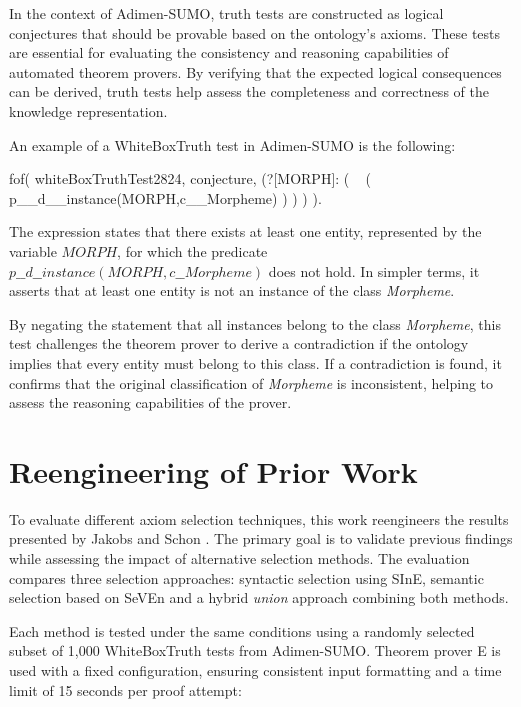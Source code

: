 \documentclass[english,version-2020-11]{uzl-thesis}
\begin{document}
In the context of Adimen-SUMO, truth tests are constructed as logical conjectures that should be provable based on the ontology's axioms. These tests are essential for evaluating the consistency and reasoning capabilities of automated theorem provers. By verifying that the expected logical consequences can be derived, truth tests help assess the completeness and correctness of the knowledge representation. 

An example of a WhiteBoxTruth test in Adimen-SUMO is the following:

\begin{Pseudocode}[morekeywords = {add, create}, deletekeywords={to}, numbers=left,
    caption = {WhiteboxTruth test example}]
    fof( whiteBoxTruthTest2824, conjecture,
        (?[MORPH]: 
            (
                ~ (
                    p__d__instance(MORPH,c__Morpheme)
                )
            )
        )
    ).
\end{Pseudocode}


The expression states that there exists at least one entity, represented by the variable \( MORPH \), for which the predicate \( p\_\_d\_\_instance(MORPH, c\_\_Morpheme) \) does not hold. In simpler terms, it asserts that at least one entity is not an instance of the class \textit{Morpheme}.

By negating the statement that all instances belong to the class \textit{Morpheme}, this test challenges the theorem prover to derive a contradiction if the ontology implies that every entity must belong to this class. If a contradiction is found, it confirms that the original classification of \textit{Morpheme} is inconsistent, helping to assess the reasoning capabilities of the prover.
\newpage
\section{Reengineering of Prior Work}

To evaluate different axiom selection techniques, this work reengineers the results presented by Jakobs and Schon \cite{Schon2024}. The primary goal is to validate previous findings while assessing the impact of alternative selection methods. The evaluation compares three selection approaches: syntactic selection using SInE, semantic selection based on SeVEn and a hybrid \textit{union} approach combining both methods.

Each method is tested under the same conditions using a randomly selected subset of 1,000 WhiteBoxTruth tests from Adimen-SUMO. Theorem prover E is used with a fixed configuration, ensuring consistent input formatting and a time limit of 15 seconds per proof attempt:
\end{document}
